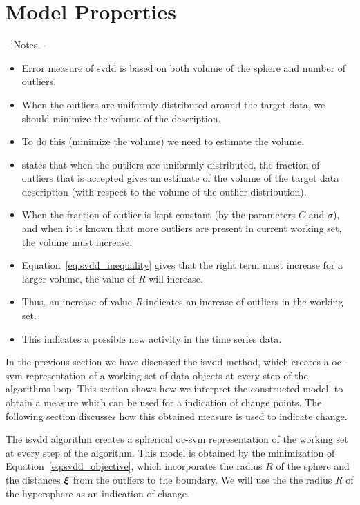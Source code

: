 \section{Model Properties}\label{sec:method_model_properties}

-- Notes --
\begin{itemize}
  \item Error measure of \gls{svdd} is based on both volume of the sphere and number of outliers.
  \item When the outliers are uniformly distributed around the target data, we should minimize the volume of the description.
  \item To do this (minimize the volume) we need to estimate the volume.
  \item \cite{tax2002uniform} states that when the outliers are uniformly distributed, the fraction of outliers that is accepted gives an estimate of the volume of the target data description (with respect to the volume of the outlier distribution).
  \item When the fraction of outlier is kept constant (by the parameters $C$ and $\sigma$), and when it is known that more outliers are present in current working set, the volume must increase.
  \item Equation~\ref{eq:svdd_inequality} gives that the right term must increase for a larger volume, \ie the value of $R$ will increase.
  \item Thus, an increase of value $R$ indicates an increase of outliers in the working set.
  \item This indicates a possible new activity in the time series data.
\end{itemize}

In the previous section we have discussed the \gls{isvdd} method, which creates a \gls{oc-svm} representation of a working set of data objects at every step of the algorithms loop.
This section shows how we interpret the constructed model, to obtain a measure which can be used for a indication of change points.
The following section discusses how this obtained measure is used to indicate change.

The \gls{isvdd} algorithm creates a spherical \gls{oc-svm} representation of the working set at every step of the algorithm.
This model is obtained by the minimization of Equation~\ref{eq:svdd_objective}, which incorporates the radius $R$ of the sphere and the distances $\vectorsym{\xi}$ from the outliers to the boundary.
We will use the the radius $R$ of the hypersphere as an indication of change.

